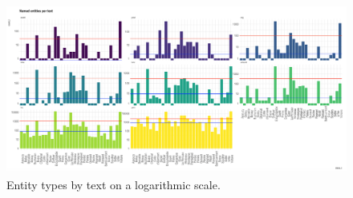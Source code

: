 \begin{figure}
    \centering
    \includegraphics[width=\textwidth]{static/media/mod_eval/dalembert/freem_ner_entity_type_by_text.png}
    \caption{Entity types by text on a logarithmic scale.}
    \label{fig:entity-type-per-text}
\end{figure}
